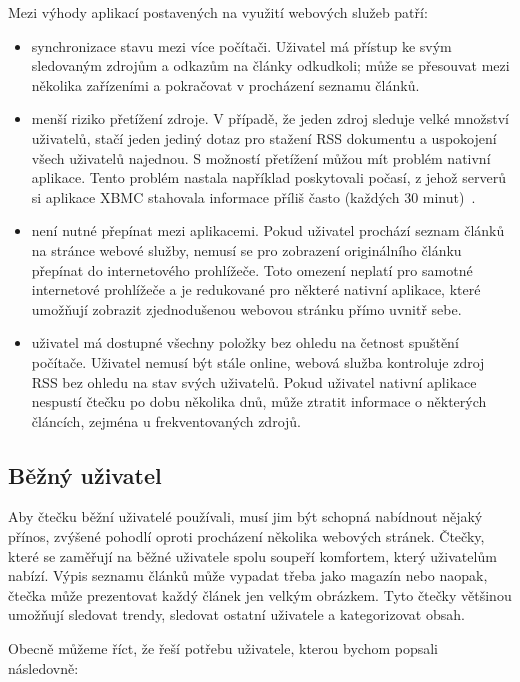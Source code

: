 Mezi výhody aplikací postavených na využití webových služeb patří:
\begin{itemize}
    \item synchronizace stavu mezi více počítači.
        Uživatel má přístup ke svým sledovaným zdrojům a odkazům na články odkudkoli; může se přesouvat mezi několika zařízeními a pokračovat v procházení seznamu článků.
    \item menší riziko přetížení zdroje.
        V případě, že jeden zdroj sleduje velké množství uživatelů, stačí jeden jediný dotaz pro stažení RSS dokumentu a uspokojení všech uživatelů najednou.
        S možností přetížení můžou mít problém nativní aplikace.
		Tento problém nastala například poskytovali počasí, z jehož serverů si aplikace XBMC stahovala informace příliš často (každých 30 minut)~\cite{xbmc-weather}.
    \item není nutné přepínat mezi aplikacemi.
        Pokud uživatel prochází seznam člán\-ků na stránce webové služby, nemusí se pro zobrazení originálního článku přepínat do internetového prohlížeče.
        Toto omezení neplatí pro samotné internetové prohlížeče a je redukované pro některé nativní aplikace, které umožňují zobrazit zjednodušenou webovou stránku přímo uvnitř sebe.
    \item uživatel má dostupné všechny položky bez ohledu na četnost spuštění počítače.
        Uživatel nemusí být stále online, webová služba kontroluje zdroj RSS bez ohledu na stav svých uživatelů.
        Pokud uživatel nativní aplikace nespustí čtečku po dobu několika dnů, může ztratit informace o některých článcích, zejména u frekventovaných zdrojů.
\end{itemize}

\bigskip

\subsection{Běžný uživatel}

Aby čtečku běžní uživatelé používali, musí jim být schopná nabídnout nějaký přínos, zvýšené pohodlí oproti procházení několika webových stránek.
Čtečky, které se zaměřují na běžné uživatele spolu soupeří komfortem, který uživatelům nabízí.
Výpis seznamu článků může vypadat třeba jako magazín nebo naopak, čtečka může prezentovat každý článek jen velkým obrázkem.
Tyto čtečky většinou umožňují sledovat trendy, sledovat ostatní uživatele a kategorizovat obsah.

Obecně můžeme říct, že řeší potřebu uživatele, kterou bychom popsali následovně:

